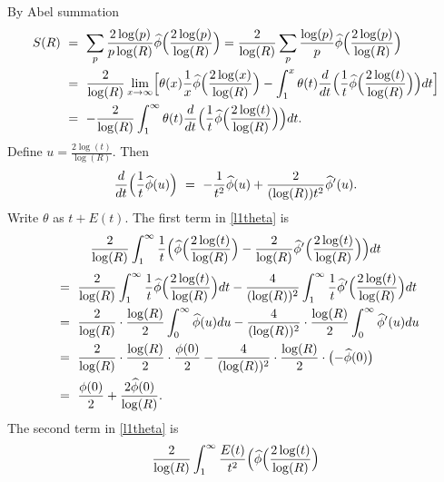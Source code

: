 \documentclass[11pt, reqno]{amsart}
\makeatletter
\renewenvironment{proof}[1][\proofname]{\par
  \vspace{-.7\topsep}%
  \pushQED{\qed}%
  \normalfont
  \topsep0pt \partopsep0pt %
  \trivlist
  \item[\hskip\labelsep
        \itshape
    #1\@addpunct{.}]\ignorespaces
}{%
  \popQED\endtrivlist\@endpefalse
  \addvspace{6pt plus 6pt} %
}
\theoremstyle{definition}
\theoremstyle{remark}
\numberwithin{equation}{section}
\renewcommand{\hat}{\widehat}
\makeatother
\begin{document}
\begin{proof}
By Abel summation
\begin{equation}
\begin{aligned}
S(R)
& \ = \ \sum_{p}\frac{2\log(p)}{p\log(R)}\hat\phi\Bigl(\frac{2\log(p)}{\log(R)}\Bigr)
=\frac{2}{\log(R)}\sum_{p}\frac{\log(p)}{p}\hat\phi\Bigl(\frac{2\log(p)}{\log(R)}\Bigr)\\
&\ = \ \frac{2}{\log(R)}\lim_{x\to\infty}\Bigl[\theta(x)\frac{1}{x}\hat\phi\Bigl(\frac{2\log(x)}{\log(R)}\Bigr)
-\int_{1}^{x}\theta(t)\frac{d}{dt}\Bigl(\frac{1}{t}\hat\phi\Bigl(\frac{2\log(t)}{\log(R)}\Bigr)\Bigr)dt\Bigr]\\
& \ = \ -\frac{2}{\log(R)}\int_{1}^{\infty}\theta(t)\frac{d}{dt}\Bigl(\frac{1}{t}\hat\phi\Bigl(\frac{2\log(t)}{\log(R)}\Bigr)\Bigr)dt.
\end{aligned}
\label{l1theta}
\end{equation}
Define \(u=\frac{2\log(t)}{\log(R)}\). Then
\begin{equation}
\frac{d}{dt}\Bigl(\frac{1}{t}\hat\phi(u)\Bigr)
\ = \ -\frac{1}{t^{2}}\hat\phi(u)+\frac{2}{(\log(R))t^{2}}\hat\phi'(u).
\end{equation}
Write $\theta$ as $t + E(t)$. The first term in \eqref{l1theta} is
\begin{equation}
\frac{2}{\log(R)}\int_{1}^{\infty}\frac{1}{t}\Bigl(\hat\phi\Bigl(\frac{2\log(t)}{\log(R)}\Bigr)
-\frac{2}{\log(R)}\hat\phi'\Bigl(\frac{2\log(t)}{\log(R)}\Bigr)\Bigr)dt
\end{equation}
\begin{equation}
\begin{aligned}
& \ = \ \frac{2}{\log(R)}\int_{1}^{\infty}\frac{1}{t}\hat{\phi}\Bigl(\frac{2\log(t)}{\log(R)}\Bigr)dt-\frac{4}{(\log(R))^{2}}\int_{1}^{\infty}\frac{1}{t}\hat\phi'\Bigl(\frac{2\log(t)}{\log(R)}\Bigr)dt\\
& \ = \ \frac{2}{\log(R)}\cdot\frac{\log(R)}{2}\int_{0}^{\infty}\hat\phi(u)du-\frac{4}{(\log(R))^{2}}\cdot\frac{\log(R)}{2}\int_{0}^{\infty}\hat\phi'(u)du\\
& \ = \ \frac{2}{\log(R)}\cdot\frac{\log(R)}{2}\cdot\frac{\phi(0)}{2}-\frac{4}{(\log(R))^{2}}\cdot\frac{\log(R)}{2}\cdot\bigl(-\hat\phi(0)\bigr)\\
&  \ = \ \frac{\phi(0)}{2}+\frac{2\hat\phi(0)}{\log(R)}. \label{l1first}
\end{aligned}
\end{equation}
The second term in \eqref{l1theta} is
\begin{equation}
\frac{2}{\log(R)}\int_{1}^{\infty}\frac{E(t)}{t^{2}}\Bigl(\hat\phi\Bigl(\frac{2\log(t)}{\log(R)}\Bigr)

\end{equation}
\end{proof}
\end{document}
